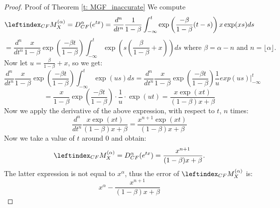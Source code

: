 \begin{proof}
    Proof of Theorem \ref{t: MGF_inaccurate}
    We compute \[\leftindex_{CF}{M}_X^{(\alpha)} = D^\alpha_{CF}(e^{tx}) = \frac{d^n}{dt^n}\frac{1}{1 - \beta}  \int_{-\infty}^{t} \exp\left(\frac{-\beta}{1 - \beta}(t - s)\right) x \exp(xs) ds\]
    \[= \frac{d^n}{dt^n}\frac{x}{1 - \beta} \exp\left(\frac{-\beta t}{1 - \beta}\right) \int_{-\infty}^{t} \exp(s\left(\frac{\beta }{1 - \beta} + x \right)) ds  \text{ where } \beta = \alpha - n \text{ and } n = \lfloor \alpha \rfloor.\]
    Now let \(u = \frac{\beta}{1 - \beta} + x\), so we get:
    \[\frac{d^n}{dt^n}\frac{x}{1 - \beta} \exp\left(\frac{-\beta t}{1 - \beta}\right) \int_{-\infty}^{t} \exp(us) ds = \frac{d^n}{dt^n}\frac{x}{1 - \beta} \exp\left(\frac{-\beta t}{1 - \beta}\right) \frac{1}{u} exp(us)\Big|_{-\infty}^{t}\]
    \[= \frac{x}{1 - \beta} \exp\left(\frac{-\beta t}{1 - \beta}\right) \cdot \frac{1}{u} \cdot \exp(u t) = \frac{x \exp(xt)}{(1 - \beta)x + \beta}\]
    Now we apply the derivative of the above expression, with respect to \(t\), \(n\) times:
    \[\frac{d^n}{d t^n} \frac{x \exp(xt)}{(1 - \beta)x + \beta} = \frac{x^{n+1} \exp(xt)}{(1 - \beta)x + \beta}\]
    Now we take a value of \(t\) around 0 and obtain:
    \[\leftindex_{CF}{M}_X^{(\alpha)} = D^\alpha_{CF}(e^{tx}) = \frac{x^{n+1} }{(1 - \beta)x + \beta}.\]
    The latter expression is not equal to \(x^\alpha\), thus the error of \(\leftindex_{CF}{M}_X^{(\alpha)}\) is:
    \[x^\alpha - \frac{x^{n+1} }{(1 - \beta)x + \beta}\]

    
\end{proof}

\newpage

